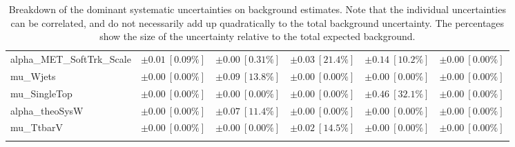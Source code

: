 \begin{sidewaystable}
\begin{center}
\begin{tabular*}{\textwidth}{@{\extracolsep{\fill}}lccccc}
alpha\_MET\_SoftTrk\_Scale         & $\pm 0.01\ [0.09\%] $          & $\pm 0.00\ [0.31\%] $          & $\pm 0.03\ [21.4\%] $          & $\pm 0.14\ [10.2\%] $          & $\pm 0.00\ [0.00\%] $       \\
mu\_Wjets         & $\pm 0.00\ [0.00\%] $          & $\pm 0.09\ [13.8\%] $          & $\pm 0.00\ [0.00\%] $          & $\pm 0.00\ [0.00\%] $          & $\pm 0.00\ [0.00\%] $       \\
mu\_SingleTop         & $\pm 0.00\ [0.00\%] $          & $\pm 0.00\ [0.00\%] $          & $\pm 0.00\ [0.00\%] $          & $\pm 0.46\ [32.1\%] $          & $\pm 0.00\ [0.00\%] $       \\
alpha\_theoSysW         & $\pm 0.00\ [0.00\%] $          & $\pm 0.07\ [11.4\%] $          & $\pm 0.00\ [0.00\%] $          & $\pm 0.00\ [0.00\%] $          & $\pm 0.00\ [0.00\%] $       \\
mu\_TtbarV         & $\pm 0.00\ [0.00\%] $          & $\pm 0.00\ [0.00\%] $          & $\pm 0.02\ [14.5\%] $          & $\pm 0.00\ [0.00\%] $          & $\pm 0.00\ [0.00\%] $       \\
\noalign{\smallskip}\hline\noalign{\smallskip}
\end{tabular*}
\end{center}
\caption[Breakdown of uncertainty on background estimates]{
Breakdown of the dominant systematic uncertainties on background estimates.
Note that the individual uncertainties can be correlated, and do not necessarily add up quadratically to 
the total background uncertainty. The percentages show the size of the uncertainty relative to the total expected background.
\label{table.results.bkgestimate.uncertainties.SRC1_bybkg}}
\end{sidewaystable}
%
